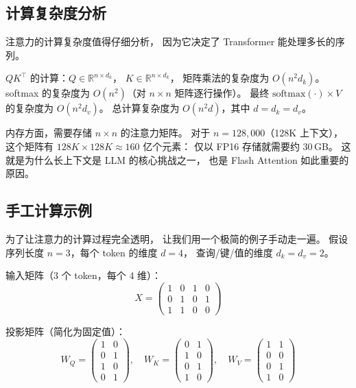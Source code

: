 \subsection{计算复杂度分析}

注意力的计算复杂度值得仔细分析，
因为它决定了 Transformer 能处理多长的序列。

$QK^\top$ 的计算：$Q \in \mathbb{R}^{n \times d_k}$，
$K \in \mathbb{R}^{n \times d_k}$，
矩阵乘法的复杂度为 $O(n^2 d_k)$。
softmax 的复杂度为 $O(n^2)$（对 $n \times n$ 矩阵逐行操作）。
最终 $\mathrm{softmax}(\cdot) \times V$ 的复杂度为 $O(n^2 d_v)$。
总计算复杂度为 $O(n^2 d)$，其中 $d = d_k = d_v$。

内存方面，需要存储 $n \times n$ 的注意力矩阵。
对于 $n = 128{,}000$（128K 上下文），
这个矩阵有 $128K \times 128K \approx 160$ 亿个元素：
仅以 FP16 存储就需要约 30\,GB。
这就是为什么长上下文是 LLM 的核心挑战之一，
也是 Flash Attention 如此重要的原因。

\subsection{手工计算示例}

为了让注意力的计算过程完全透明，
让我们用一个极简的例子手动走一遍。
假设序列长度 $n = 3$，每个 token 的维度 $d = 4$，
查询/键/值的维度 $d_k = d_v = 2$。

输入矩阵（3 个 token，每个 4 维）：
\[
X = \begin{pmatrix}
  1 & 0 & 1 & 0 \\
  0 & 1 & 0 & 1 \\
  1 & 1 & 0 & 0
\end{pmatrix}
\]

投影矩阵（简化为固定值）：
\[
W_Q = \begin{pmatrix} 1 & 0 \\ 0 & 1 \\ 1 & 0 \\ 0 & 1 \end{pmatrix}, \quad
W_K = \begin{pmatrix} 0 & 1 \\ 1 & 0 \\ 0 & 1 \\ 1 & 0 \end{pmatrix}, \quad
W_V = \begin{pmatrix} 1 & 1 \\ 0 & 0 \\ 0 & 1 \\ 1 & 0 \end{pmatrix}
\]

